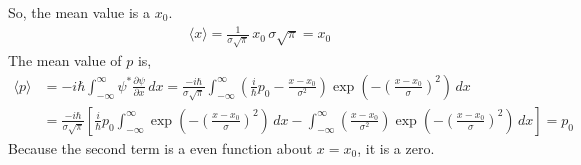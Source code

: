 \documentclass[floatfix,nofootinbib,superscriptaddress,fleqn]{revtex4}
\begin{document}
\begin{itemize}
So, the mean value is a $x_0$.
  \begin{align}
    \langle x \rangle=\frac{1}{\sigma\sqrt{\pi}}\,x_0\,\sigma\sqrt{\pi} = x_0
  \end{align}
The mean value of $p$ is,
  \begin{align}
    \langle p \rangle &= -i\hbar \int_{-\infty}^{\infty} 
    \psi^*\frac{\partial \psi}{\partial x}\,dx 
    =\frac{-i\hbar}{\sigma\sqrt{\pi}}
    \int_{-\infty}^{\infty}
    \left(\frac{i}{\hbar}p_0
    -\frac{x-x_0}{\sigma^2}\right)
    \exp\left(-{\left(\frac{x-x_0}{\sigma}\right)}^2 \right)\,dx \\
    &=\frac{-i\hbar}{\sigma\sqrt{\pi}}\left[\frac{i}{\hbar}p_0
    \int_{-\infty}^{\infty}
    \exp\left(-{\left(\frac{x-x_0}{\sigma}\right)}^2 \right)\,dx 
    -\int_{-\infty}^{\infty}
    \left(\frac{x-x_0}{\sigma^2}\right)
    \exp\left(-{\left(\frac{x-x_0}{\sigma}\right)}^2\right)\,dx\right] 
    = p_0    
  \end{align}
Because the second term is a even function about $x=x_0$, it is a zero.


\end{itemize}
\end{document}
